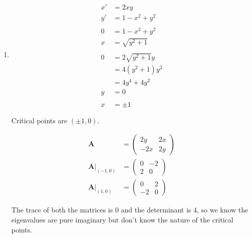 \documentclass{article}
\begin{document}
\begin{enumerate}
  \item

        \begin{align*}
          x' & = 2 x y              \\
          y' & = 1 - x^2 + y^2      \\ \\
          0  & = 1 - x^2 + y^2      \\
          x  & = \sqrt{y^2 + 1}     \\ \\
          0  & = 2 \sqrt{y^2 + 1} y \\
             & = 4 (y^2 + 1) y^2    \\
             & = 4 y^4 + 4 y^2      \\
          y  & = 0                  \\ \\
          x  & = \pm 1
        \end{align*}

        Critical points are $(\pm 1, 0)$.

        \begin{align*}
          \mathbf{A}                          & = \begin{pmatrix}
                                                    2 y  & 2 x \\
                                                    -2 x & 2 y
                                                  \end{pmatrix} \\
          \left. \mathbf{A} \right|_{(-1, 0)} & = \begin{pmatrix}
                                                    0 & -2 \\
                                                    2 & 0
                                                  \end{pmatrix} \\
          \left. \mathbf{A} \right|_{(1, 0)}  & = \begin{pmatrix}
                                                    0  & 2 \\
                                                    -2 & 0
                                                  \end{pmatrix}
        \end{align*}

        The trace of both the matrices is $0$ and the determinant is $4$, so we know the eigenvalues are pure imaginary but don't know the nature of the critical points.


\end{enumerate}
\end{document}
